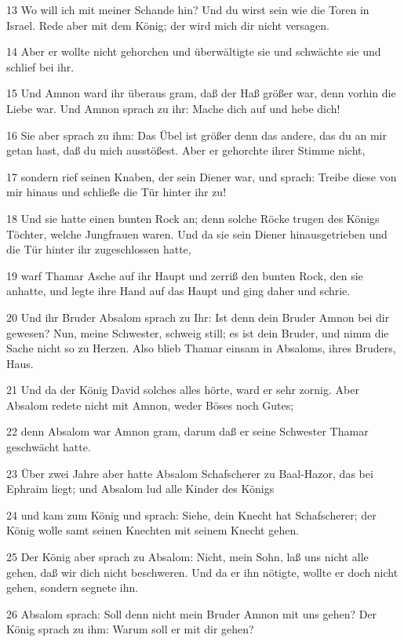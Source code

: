 \par 13 Wo will ich mit meiner Schande hin? Und du wirst sein wie die Toren in Israel. Rede aber mit dem König; der wird mich dir nicht versagen.
\par 14 Aber er wollte nicht gehorchen und überwältigte sie und schwächte sie und schlief bei ihr.
\par 15 Und Amnon ward ihr überaus gram, daß der Haß größer war, denn vorhin die Liebe war. Und Amnon sprach zu ihr: Mache dich auf und hebe dich!
\par 16 Sie aber sprach zu ihm: Das Übel ist größer denn das andere, das du an mir getan hast, daß du mich ausstößest. Aber er gehorchte ihrer Stimme nicht,
\par 17 sondern rief seinen Knaben, der sein Diener war, und sprach: Treibe diese von mir hinaus und schließe die Tür hinter ihr zu!
\par 18 Und sie hatte einen bunten Rock an; denn solche Röcke trugen des Königs Töchter, welche Jungfrauen waren. Und da sie sein Diener hinausgetrieben und die Tür hinter ihr zugeschlossen hatte,
\par 19 warf Thamar Asche auf ihr Haupt und zerriß den bunten Rock, den sie anhatte, und legte ihre Hand auf das Haupt und ging daher und schrie.
\par 20 Und ihr Bruder Absalom sprach zu Ihr: Ist denn dein Bruder Amnon bei dir gewesen? Nun, meine Schwester, schweig still; es ist dein Bruder, und nimm die Sache nicht so zu Herzen. Also blieb Thamar einsam in Absaloms, ihres Bruders, Haus.
\par 21 Und da der König David solches alles hörte, ward er sehr zornig. Aber Absalom redete nicht mit Amnon, weder Böses noch Gutes;
\par 22 denn Absalom war Amnon gram, darum daß er seine Schwester Thamar geschwächt hatte.
\par 23 Über zwei Jahre aber hatte Absalom Schafscherer zu Baal-Hazor, das bei Ephraim liegt; und Absalom lud alle Kinder des Königs
\par 24 und kam zum König und sprach: Siehe, dein Knecht hat Schafscherer; der König wolle samt seinen Knechten mit seinem Knecht gehen.
\par 25 Der König aber sprach zu Absalom: Nicht, mein Sohn, laß uns nicht alle gehen, daß wir dich nicht beschweren. Und da er ihn nötigte, wollte er doch nicht gehen, sondern segnete ihn.
\par 26 Absalom sprach: Soll denn nicht mein Bruder Amnon mit uns gehen? Der König sprach zu ihm: Warum soll er mit dir gehen?
